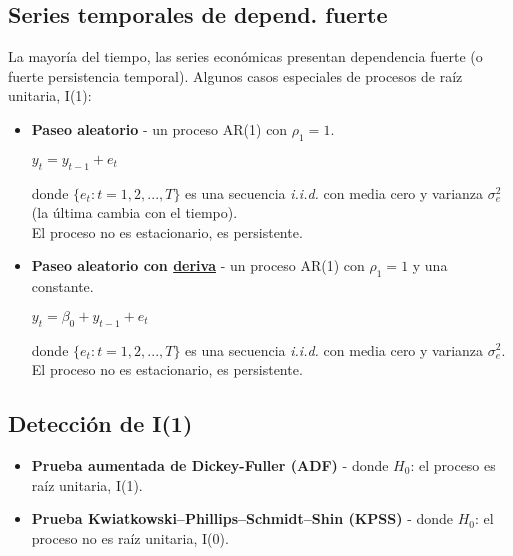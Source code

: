 \documentclass[10pt, a4paper, landscape]{extarticle}
\begin{document}
\begin{multicols}{3}
\section*{Series temporales de depend. fuerte}
	La mayoría del tiempo, las series económicas presentan dependencia fuerte (o fuerte persistencia temporal). Algunos casos especiales de procesos de raíz unitaria, I(1):
	\begin{itemize}[leftmargin=*]
		\item \textbf{Paseo aleatorio} - un proceso AR(1) con $\rho_1 = 1$.
		\begin{center}
			$y_t = y_{t-1} + e_t$
		\end{center}
		donde $\lbrace e_t : t = 1, 2, ..., T \rbrace$ es una secuencia \textsl{i.i.d.} con media cero y varianza $\sigma^2_e$ (la última cambia con el tiempo). \\
		El proceso no es estacionario, es persistente.
		\item \textbf{Paseo aleatorio con \href{https://www.youtube.com/watch?v=pS5d77DQHOI}{deriva}} - un proceso AR(1) con $\rho_1 = 1$ y una constante.
		\begin{center}
			$y_t = \beta_0 + y_{t-1} + e_t$
		\end{center}
		donde $\lbrace e_t : t = 1, 2, ..., T \rbrace$ es una secuencia \textsl{i.i.d.} con media cero y varianza $\sigma^2_e$. \\
		El proceso no es estacionario, es persistente.
	\end{itemize}
	\subsection*{Detección de I(1)}
		\begin{itemize}[leftmargin=*]
			\item \textbf{Prueba aumentada de Dickey-Fuller (ADF)} - donde $H_0$: el proceso es raíz unitaria, I(1).
			\item \textbf{Prueba Kwiatkowski–Phillips–Schmidt–Shin (KPSS)} - donde $H_0$: el proceso no es raíz unitaria, I(0).
		\end{itemize}

\end{multicols}
\end{document}
